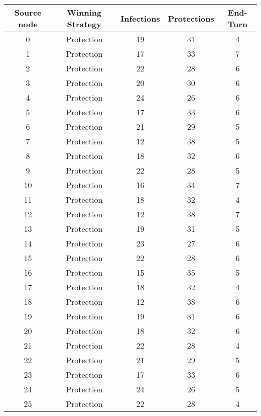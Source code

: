 \documentclass[results.tex]{subfiles}
\begin{document}
\begin{center}
  \begin{tabular}{| c || c | c | c | c |}
    \hline
    {\bfseries Source node} & {\bfseries Winning Strategy} & {\bfseries Infections} & {\bfseries Protections} & {\bfseries End-Turn} \\  %
    \hline\hline
    0 & Protection & 19 & 31 & 4 \\ 
    \hline
    1 & Protection & 17 & 33 & 7 \\ 
    \hline
    2 & Protection & 22 & 28 & 6 \\ 
    \hline
    3 & Protection & 20 & 30 & 6 \\ 
    \hline
    4 & Protection & 24 & 26 & 6 \\ 
    \hline
    5 & Protection & 17 & 33 & 6 \\ 
    \hline
    6 & Protection & 21 & 29 & 5 \\ 
    \hline
    7 & Protection & 12 & 38 & 5 \\ 
    \hline
    8 & Protection & 18 & 32 & 6 \\ 
    \hline
    9 & Protection & 22 & 28 & 5 \\ 
    \hline
    10 & Protection & 16 & 34 & 7 \\ 
    \hline
    11 & Protection & 18 & 32 & 4 \\ 
    \hline
    12 & Protection & 12 & 38 & 7 \\ 
    \hline
    13 & Protection & 19 & 31 & 5 \\ 
    \hline
    14 & Protection & 23 & 27 & 6 \\ 
    \hline
    15 & Protection & 22 & 28 & 6 \\ 
    \hline
    16 & Protection & 15 & 35 & 5 \\ 
    \hline
    17 & Protection & 18 & 32 & 4 \\ 
    \hline
    18 & Protection & 12 & 38 & 6 \\ 
    \hline
    19 & Protection & 19 & 31 & 6 \\ 
    \hline
    20 & Protection & 18 & 32 & 6 \\ 
    \hline
    21 & Protection & 22 & 28 & 4 \\ 
    \hline
    22 & Protection & 21 & 29 & 5 \\ 
    \hline
    23 & Protection & 17 & 33 & 6 \\ 
    \hline
    24 & Protection & 24 & 26 & 5 \\ 
    \hline
    25 & Protection & 22 & 28 & 4 \\ 

\end{tabular}
\end{center}
\end{document}
